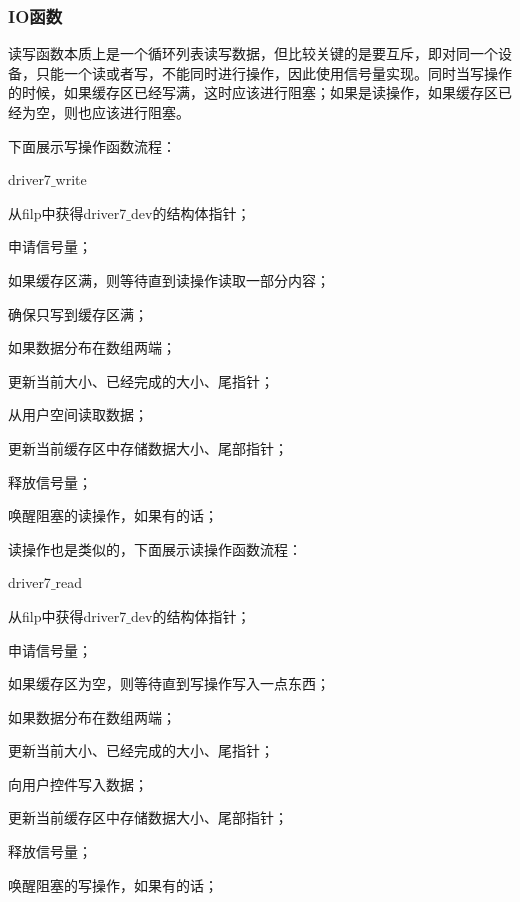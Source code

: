 \documentclass[UTF8]{ctexart}
\begin{document}
\subsubsection{IO函数}
读写函数本质上是一个循环列表读写数据，但比较关键的是要互斥，即对同一个设备，只能一个读或者写，不能同时进行操作，因此使用信号量实现。同时当写操作的时候，如果缓存区已经写满，这时应该进行阻塞；如果是读操作，如果缓存区已经为空，则也应该进行阻塞。\par
下面展示写操作函数流程：\par
\begin{algorithm}
\caption{driver7$\_$write}
\begin{algorithmic}[1]
\STATE 从filp中获得driver7$\_$dev的结构体指针；\par
\STATE 申请信号量；\par
\STATE 如果缓存区满，则等待直到读操作读取一部分内容；\par
\STATE 确保只写到缓存区满；\par
\STATE 如果数据分布在数组两端；\par
\STATE \qquad 更新当前大小、已经完成的大小、尾指针；\par
\STATE 从用户空间读取数据；\par
\STATE 更新当前缓存区中存储数据大小、尾部指针；\par
\STATE 释放信号量；\par
\STATE 唤醒阻塞的读操作，如果有的话；\par
\end{algorithmic}
\end{algorithm}

读操作也是类似的，下面展示读操作函数流程：\par
\begin{algorithm}
\caption{driver7$\_$read}
\begin{algorithmic}[1]
\STATE 从filp中获得driver7$\_$dev的结构体指针；\par
\STATE 申请信号量；\par
\STATE 如果缓存区为空，则等待直到写操作写入一点东西；\par
\STATE 如果数据分布在数组两端；\par
\STATE \qquad 更新当前大小、已经完成的大小、尾指针；\par
\STATE 向用户控件写入数据；\par
\STATE 更新当前缓存区中存储数据大小、尾部指针；\par
\STATE 释放信号量；\par
\STATE 唤醒阻塞的写操作，如果有的话；\par
\end{algorithmic}
\end{algorithm}
\end{document}
